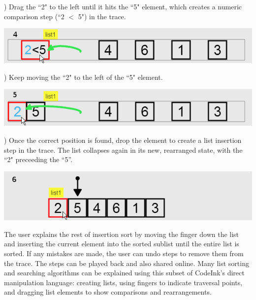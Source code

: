) Drag the ``2" to the left until it hits the ``5" element, which
creates a numeric comparison step (``2 $<$ 5") in the trace.

\vspace{-0.25em}
\noindent \includegraphics[width=0.7\columnwidth]{img/examples/insertion-4.png}
\vspace{0.5em}

) Keep moving the ``2" to the left of the ``5" element.

\vspace{-0.25em}
\noindent \includegraphics[width=0.7\columnwidth]{img/examples/insertion-5.png}
\vspace{0.5em}

) Once the correct position is found, drop the element
to create a list insertion step in the trace. The list collapses again in its new, rearranged state, with the
``2" preceeding the ``5''.

\noindent \includegraphics[width=0.7\columnwidth]{img/examples/insertion-6.png}

The user explains the rest of insertion sort by moving the finger down the list
and inserting the current element into the sorted sublist until the entire list
is sorted. If any mistakes are made, the user can undo steps to remove them
from the trace. The steps can be played back and also shared online.
Many list sorting and searching algorithms can be explained using this subset of CodeInk's direct
manipulation language: creating lists, using fingers to indicate traversal
points, and dragging list elements to show comparisons and rearrangements.



